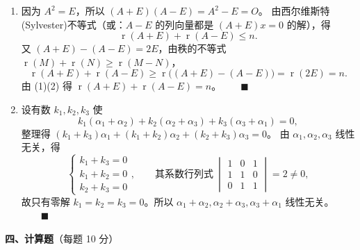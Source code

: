 \documentclass[12pt]{ctexart}
\newcommand{\rank}{\operatorname{r}}
\begin{document}
\begin{enumerate}[label=\textbf{\arabic*.},itemsep=11pt]
\item 因为 $A^{2}=E$，所以 $(A+E)(A-E)=A^{2}-E=O$。
  由西尔维斯特(Sylvester)不等式（或：$A-E$ 的列向量都是 $(A+E)x=0$ 的解），得
  \[
  \rank(A+E)+\rank(A-E)\leq n. \tag{1}
  \]
  又 $(A+E)-(A-E)=2E$，由秩的不等式 $\rank(M)+\rank(N)\geq\rank(M-N)$，
  \[
  \rank(A+E)+\rank(A-E)\geq \rank\big((A+E)-(A-E)\big)=\rank(2E)=n. \tag{2}
  \]
  由 (1)(2) 得 $\rank(A+E)+\rank(A-E)=n$。$\qquad\blacksquare$

\item 设有数 $k_1,k_2,k_3$ 使
  \[
  k_1(\alpha_1+\alpha_2)+k_2(\alpha_2+\alpha_3)+k_3(\alpha_3+\alpha_1)=0,
  \]
  整理得 $(k_1+k_3)\alpha_1+(k_1+k_2)\alpha_2+(k_2+k_3)\alpha_3=0$。
  由 $\alpha_1,\alpha_2,\alpha_3$ 线性无关，得
  \[
  \begin{cases}k_1+k_3=0\\ k_1+k_2=0\\ k_2+k_3=0\end{cases},
  \qquad
  \text{其系数行列式}\
  \begin{vmatrix}1&0&1\\1&1&0\\0&1&1\end{vmatrix}=2\neq0,
  \]
  故只有零解 $k_1=k_2=k_3=0$。所以 $\alpha_1+\alpha_2,\alpha_2+\alpha_3,\alpha_3+\alpha_1$ 线性无关。$\qquad\blacksquare$
\end{enumerate}

\vspace{6pt}
\noindent\textbf{四、计算题}（每题 10 分）
\end{document}
